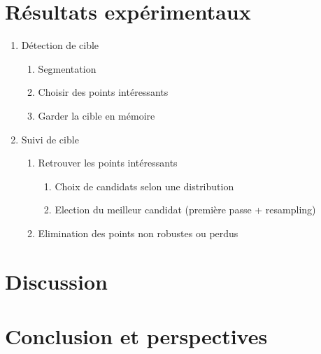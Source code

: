 \documentclass[a4paper,12pt]{report}
\begin{document}
\chapter{Résultats expérimentaux}

\begin{enumerate}
	\item Détection de cible
	\begin{enumerate}
		\item Segmentation
		\item Choisir des points intéressants
		\item Garder la cible en mémoire
	\end{enumerate}
	\item Suivi de cible
	\begin{enumerate}
		\item Retrouver les points intéressants
		\begin{enumerate}
			\item Choix de candidats selon une distribution
			\item Election du meilleur candidat (première passe + resampling)
		\end{enumerate}
		\item Elimination des points non robustes ou perdus
	\end{enumerate}
\end{enumerate}

\chapter{Discussion}



\chapter{Conclusion et perspectives}






\nocite{*}

\listoffigures
\end{document}
